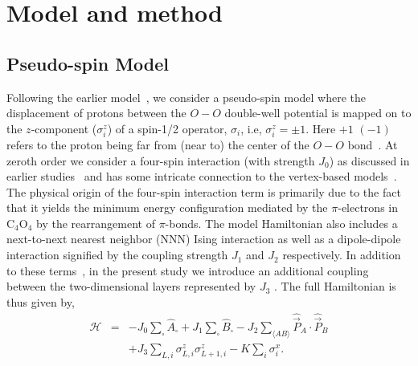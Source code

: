 \section{Model and method}
\label{model}
\subsection{Pseudo-spin Model}
Following the earlier model~\cite{ishizuka2011quantum,vijigiri2020dipole}, we consider a pseudo-spin model where the displacement of protons between the $O-O$ double-well potential is mapped on to the $z$-component ($\sigma^z_i$) of a spin-1/2 operator, $\sigma_i$, i.e, $\sigma^z_i=\pm 1$. Here $+1$ $(-1)$ refers to the proton being far from (near to) the center of the $O-O$ bond~\cite{blinc1960isotopic,horiuchi2008organic}. At zeroth order we consider a  four-spin interaction (with strength $J_0$)  as discussed in earlier studies~\cite{wesselinowa1995green} and has some intricate connection to the vertex-based models~\cite{stilck1981vertex}. The physical origin of the four-spin interaction term is primarily due to the fact that it yields the minimum energy configuration mediated by the $\pi$-electrons in $\text{C}_4\text{O}_4$ by the rearrangement of $\pi$-bonds. The model Hamiltonian also includes a next-to-next nearest neighbor (NNN) Ising interaction as well as a dipole-dipole interaction signified by the coupling strength $J_1$ and $J_2$ respectively. In addition to these terms~\cite{chern2014gauge}, in the present study we introduce an additional coupling between the two-dimensional layers represented by $J_3$ . The full Hamiltonian is thus given by,
\begin{eqnarray}
\label{Hamiltonian}
\mathcal{H} &=& -J_0\sum_{\square} \hat{A}_{\square} + J_1\sum_{\square}\hat{B}_{\square}
 - J_2\sum_{\langle AB \rangle}\hat{\vec{P}}_{A}\cdot\hat{\vec{P}}_{B} \nonumber  \\
 && + J_3\sum_{L, i}\sigma_{L,i}^{z}\sigma_{L+1,i}^{z} - K\sum_{i}\sigma_{i}^{x} . %
\end{eqnarray}

